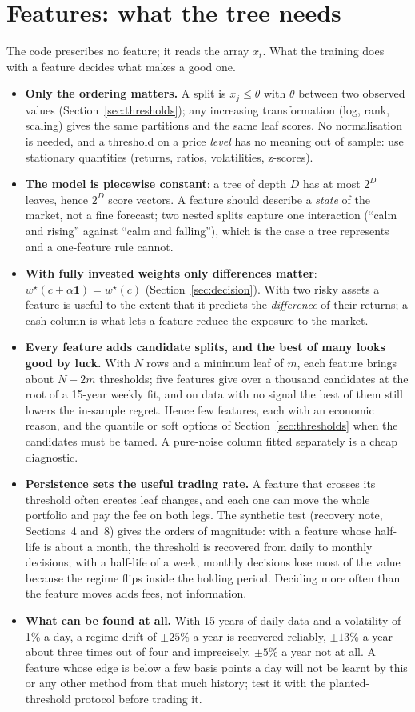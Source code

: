 \documentclass[11pt,a4paper]{article}
\newcommand{\1}{\mathbf{1}}
\begin{document}
\section{Features: what the tree needs}\label{sec:features}
The code prescribes no feature; it reads the array $x_t$. What the training does with a feature decides what makes a good one.
\begin{itemize}\setlength{\itemsep}{1pt}
\item \textbf{Only the ordering matters.} A split is $x_j\le\theta$ with $\theta$ between two observed values (Section~\ref{sec:thresholds}); any increasing transformation (log, rank, scaling) gives the same partitions and the same leaf scores. No normalisation is needed, and a threshold on a price \emph{level} has no meaning out of sample: use stationary quantities (returns, ratios, volatilities, z-scores).
\item \textbf{The model is piecewise constant}: a tree of depth $D$ has at most $2^D$ leaves, hence $2^D$ score vectors. A feature should describe a \emph{state} of the market, not a fine forecast; two nested splits capture one interaction (``calm and rising'' against ``calm and falling''), which is the case a tree represents and a one-feature rule cannot.
\item \textbf{With fully invested weights only differences matter}: $w^\star(c+\alpha\1)=w^\star(c)$ (Section~\ref{sec:decision}). With two risky assets a feature is useful to the extent that it predicts the \emph{difference} of their returns; a cash column is what lets a feature reduce the exposure to the market.
\item \textbf{Every feature adds candidate splits, and the best of many looks good by luck.} With $N$ rows and a minimum leaf of $m$, each feature brings about $N-2m$ thresholds; five features give over a thousand candidates at the root of a 15-year weekly fit, and on data with no signal the best of them still lowers the in-sample regret. Hence few features, each with an economic reason, and the quantile or soft options of Section~\ref{sec:thresholds} when the candidates must be tamed. A pure-noise column fitted separately is a cheap diagnostic.
\item \textbf{Persistence sets the useful trading rate.} A feature that crosses its threshold often creates leaf changes, and each one can move the whole portfolio and pay the fee on both legs. The synthetic test (recovery note, Sections~4 and~8) gives the orders of magnitude: with a feature whose half-life is about a month, the threshold is recovered from daily to monthly decisions; with a half-life of a week, monthly decisions lose most of the value because the regime flips inside the holding period. Deciding more often than the feature moves adds fees, not information.
\item \textbf{What can be found at all.} With 15 years of daily data and a volatility of 1\% a day, a regime drift of $\pm25\%$ a year is recovered reliably, $\pm13\%$ a year about three times out of four and imprecisely, $\pm5\%$ a year not at all. A feature whose edge is below a few basis points a day will not be learnt by this or any other method from that much history; test it with the planted-threshold protocol before trading it.
\end{itemize}
\end{document}
